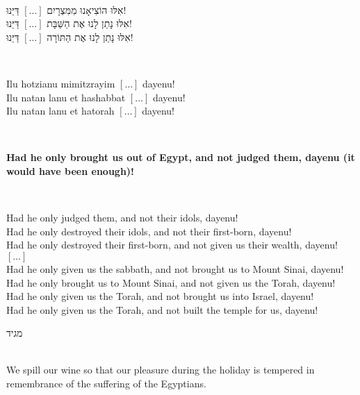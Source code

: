 \documentclass[a4paper,10pt,openany]{memoir}
\newcommand{\HgInst}[1]{{\noindent\sffamily{\bfseries{#1}}}}
\newcommand{\HgEllipsis}{\ensuremath{\left[\ldots\right]}}
\newcommand{\hchapter}[1]{
  \begin{hebrew}
    \begin{Spacing}{.97}
      \newpage
      \strut

      \vspace{.15em}

      \noindent\Huge #1

      \vspace{1em}
    \end{Spacing}
  \end{hebrew}
}
\newcommand{\HgHL}[1]{{\Large\bfseries#1\par\noindent\\[-.5em]}}
\newenvironment{HgEnglish}{\strut\\\noindent}{\vspace{1em}}
\newenvironment{HgTranslit}{\strut\\\noindent\begin{itshape}}{\end{itshape}\vspace{1em}}
\newenvironment{HgHebrew}{\begin{hebrew}\strut\\\noindent\Large}{\end{hebrew}}
\begin{document}
\HgInst{Then read or sing:}

\begin{HgHebrew}
  אִלּוּ הוֹצִיאָנוּ מִמִּצְרָיִם
  \HgEllipsis{}
  דַּיֵּנוּ!
  \\
  אִלּוּ נָתַן לָנוּ אֶת הַשַּׁבָּת
  \HgEllipsis{}
  דַּיֵּנוּ!
  \\
  אִלּוּ נָתַן לָנוּ אֶת הַתּוֹרָה
  \HgEllipsis{}
  דַּיֵּנוּ!
\end{HgHebrew}

\begin{HgTranslit}
  Ilu hotzianu mimitzrayim \HgEllipsis{} dayenu! \\
  Ilu natan lanu et hashabbat \HgEllipsis{} dayenu! \\
  Ilu natan lanu et hatorah \HgEllipsis{} dayenu!
\end{HgTranslit}

\begin{HgEnglish}
  \HgHL{
  Had he only brought us out of Egypt, and not judged them, dayenu (it would
  have been enough)!}
  Had he only judged them, and not their idols, dayenu!\\
  Had he only destroyed their idols, and not their first-born, dayenu!\\
  Had he only destroyed their first-born, and not given us their wealth, dayenu!\\
  \HgEllipsis\\
  Had he only given us the sabbath, and not brought us to Mount Sinai, dayenu!\\
  Had he only brought us to Mount Sinai, and not given us the Torah, dayenu!\\
  Had he only given us the Torah, and not brought us into Israel, dayenu!\\
  Had he only given us the Torah, and not built the temple for us, dayenu!
\end{HgEnglish}

\vfill

\hchapter{מגיד}

\begin{HgEnglish}
  We spill our wine so that our pleasure during the holiday is tempered in
  remembrance of the  suffering of the Egyptians.
\end{HgEnglish}
\end{document}
